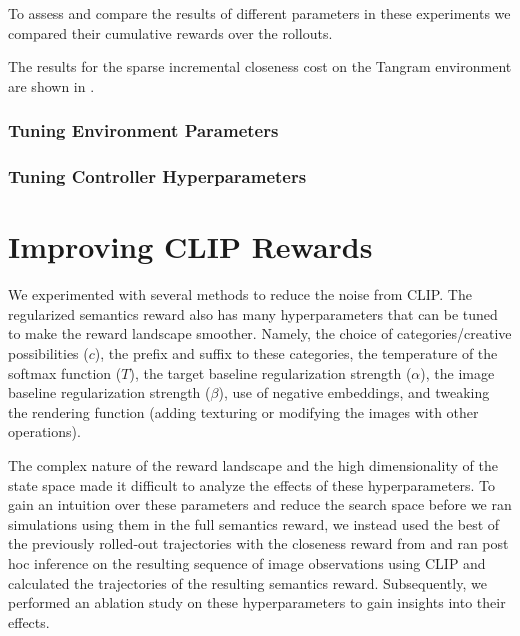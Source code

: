 To assess and compare the results of different parameters in these experiments we compared their cumulative rewards over the rollouts.

The results for the sparse incremental closeness cost on the Tangram environment are shown in .

\subsubsection{Tuning Environment Parameters}
\label{sec:env-hyperparameters}

\label{sec:sgw-hyperparameters}


\label{sec:tangram-hyperparameters}


\subsubsection{Tuning Controller Hyperparameters}
\label{sec:icem-hyperparameters}



\section{Improving CLIP Rewards}
\label{sec:improving-rewards}

We experimented with several methods to reduce the noise from CLIP.
The regularized semantics reward also has many hyperparameters that can be tuned to make the reward landscape smoother.
Namely, the choice of categories/creative possibilities (\(c\)), the prefix and suffix to these categories, the temperature of the softmax function (\(T\)), the target baseline regularization strength (\(\alpha\)), the image baseline regularization strength (\(\beta\)), use of negative embeddings, and tweaking the rendering function (adding texturing or modifying the images with other operations).

The complex nature of the reward landscape and the high dimensionality of the state space made it difficult to analyze the effects of these hyperparameters.
To gain an intuition over these parameters and reduce the search space before we ran simulations using them in the full semantics reward, we instead used the best of the previously rolled-out trajectories with the closeness reward from  and ran post hoc inference on the resulting sequence of image observations using CLIP and calculated the trajectories of the resulting semantics reward.
Subsequently, we performed an ablation study on these hyperparameters to gain insights into their effects.

